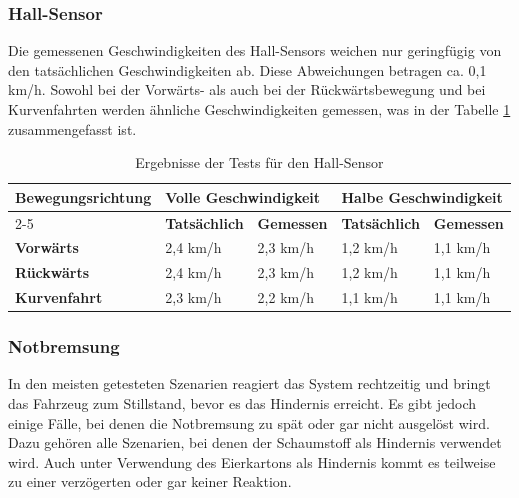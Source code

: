         \subsubsection{Hall-Sensor}
        Die gemessenen Geschwindigkeiten des Hall-Sensors weichen nur geringfügig von den tatsächlichen Geschwindigkeiten ab. Diese Abweichungen betragen ca. 0,1 km/h. Sowohl bei der Vorwärts- als auch bei der Rückwärtsbewegung und bei Kurvenfahrten werden ähnliche Geschwindigkeiten gemessen, was in der Tabelle \ref{tab:hall_sensor_ergebnisse} zusammengefasst ist.
        \begin{table}[H]
            \begin{tabular}{|l|ll|ll|}
                \hline
                \multirow{2}{*}{\textbf{Bewegungsrichtung}} & \multicolumn{2}{l|}{\textbf{Volle Geschwindigkeit}}           & \multicolumn{2}{l|}{\textbf{Halbe Geschwindigkeit}}           \\ \cline{2-5} 
                                                            & \multicolumn{1}{l|}{\textbf{Tatsächlich}} & \textbf{Gemessen} & \multicolumn{1}{l|}{\textbf{Tatsächlich}} & \textbf{Gemessen} \\ \hline
                \textbf{Vorwärts}                                    & \multicolumn{1}{l|}{2,4 km/h}             & 2,3 km/h          & \multicolumn{1}{l|}{1,2 km/h}             & 1,1 km/h          \\ \hline
                \textbf{Rückwärts}                                   & \multicolumn{1}{l|}{2,4 km/h}             & 2,3 km/h          & \multicolumn{1}{l|}{1,2 km/h}             & 1,1 km/h          \\ \hline
                \textbf{Kurvenfahrt}                                 & \multicolumn{1}{l|}{2,3 km/h}             & 2,2 km/h          & \multicolumn{1}{l|}{1,1 km/h}             & 1,1 km/h          \\ \hline
            \end{tabular}
            \caption{Ergebnisse der Tests für den Hall-Sensor}
            \label{tab:hall_sensor_ergebnisse}
        \end{table}

        \subsubsection{Notbremsung}
        In den meisten getesteten Szenarien reagiert das System rechtzeitig und bringt das Fahrzeug zum Stillstand, bevor es das Hindernis erreicht. Es gibt jedoch einige Fälle, bei denen die Notbremsung zu spät oder gar nicht ausgelöst wird. Dazu gehören alle Szenarien, bei denen der Schaumstoff als Hindernis verwendet wird. Auch unter Verwendung des Eierkartons als Hindernis kommt es teilweise zu einer verzögerten oder gar keiner Reaktion.

